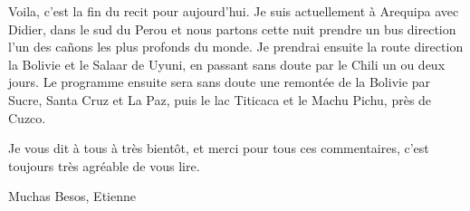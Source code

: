 \begin{multicols}{2}
Voila, c'est la fin du recit pour aujourd'hui. Je suis actuellement à Arequipa avec Didier, dans le sud du Perou et nous partons cette nuit prendre un bus direction l'un des cañons les plus profonds du monde. Je prendrai ensuite la route direction la Bolivie et le Salaar de Uyuni, en passant sans doute par le Chili un ou deux jours. Le programme ensuite sera sans doute une remontée de la Bolivie par Sucre, Santa Cruz et La Paz, puis le lac Titicaca et le Machu Pichu, près de Cuzco.

Je vous dit à tous à très bientôt, et merci pour tous ces commentaires, c'est toujours très agréable de vous lire.

Muchas Besos, Etienne

\end{multicols}


